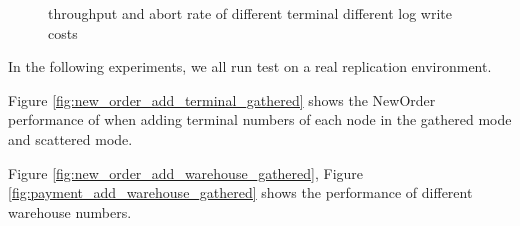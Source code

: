 \documentclass[conference]{IEEEtran}
\begin{document}
\begin{figure}[htbp]
  \centering
\caption{throughput and abort rate of
different terminal different log write costs}
\label{fig:new_order_add_log_cost}
\end{figure}


In the following experiments,
we all run test on a real replication environment.

Figure \ref{fig:new_order_add_terminal_gathered} shows the NewOrder performance of when adding terminal numbers of each node in the gathered  mode and scattered mode.

Figure \ref{fig:new_order_add_warehouse_gathered},
Figure \ref{fig:payment_add_warehouse_gathered} shows
the performance of different warehouse numbers.
\end{document}
